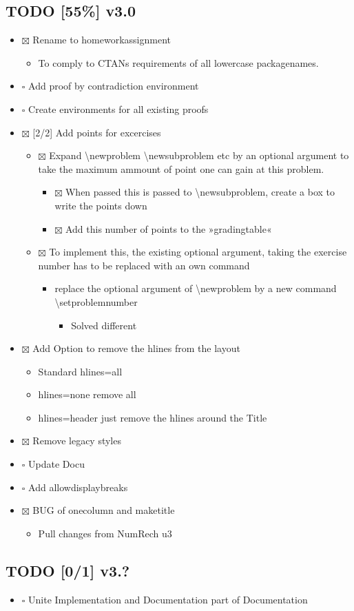 \documentclass[11pt]{article}
\begin{document}
\subsection{{\bfseries\sffamily TODO} [55\%] v3.0}
\label{sec-3-1}
\begin{itemize}
\item $\boxtimes$ Rename to homeworkassignment
\begin{itemize}
\item To comply to CTANs requirements of all lowercase packagenames.
\end{itemize}
\item $\square$ Add proof by contradiction environment
\item $\square$ Create environments for all existing proofs
\item $\boxtimes$ [2/2] Add points for excercises
\begin{itemize}
\item $\boxtimes$ Expand \textbackslash{}newproblem \textbackslash{}newsubproblem etc
by an optional argument to take the maximum ammount of point one
can gain at this problem. 
\begin{itemize}
\item $\boxtimes$ When passed this is passed to \textbackslash{}newsubproblem,
create a box to write the points down
\item $\boxtimes$ Add this number of points to the »gradingtable«
\end{itemize}
\item $\boxtimes$ To implement this, the existing optional argument, taking
the exercise number has to be replaced with an own command
\begin{itemize}
\item replace the optional argument of
\textbackslash{}newproblem by a new command
\textbackslash{}setproblemnumber
\begin{itemize}
\item Solved different
\end{itemize}
\end{itemize}
\end{itemize}
\item $\boxtimes$ Add Option to remove the hlines from the layout
\begin{itemize}
\item Standard hlines=all
\item hlines=none remove all
\item hlines=header just remove the hlines around the Title
\end{itemize}
\item $\boxtimes$ Remove legacy styles
\item $\square$ Update Docu
\item $\square$ Add allowdisplaybreaks
\item $\boxtimes$ BUG of onecolumn and maketitle
\begin{itemize}
\item Pull changes from NumRech u3
\end{itemize}
\end{itemize}
\subsection{{\bfseries\sffamily TODO} [0/1] v3.?}
\label{sec-3-2}
\begin{itemize}
\item $\square$ Unite Implementation and Documentation part of Documentation
\end{itemize}
\end{document}
